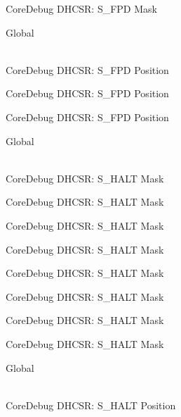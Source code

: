 \begin{DoxyRefList}
\label{deprecated__deprecated000567}%
%
Core\+Debug DHCSR\+: S\+\_\+\+FPD Mask  
\item[{\parbox[t]{\linewidth}{Global \doxylink{group___c_m_s_i_s___s_c_b_ga620b141720c475f5bde4138855c6ed83}{Core\+Debug\+\_\+\+DHCSR\+\_\+\+S\+\_\+\+FPD\+\_\+\+Pos} }}]\hfill \\
\label{deprecated__deprecated000013}%
%
Core\+Debug DHCSR\+: S\+\_\+\+FPD Position 

\label{deprecated__deprecated000464}%
%
Core\+Debug DHCSR\+: S\+\_\+\+FPD Position 

\label{deprecated__deprecated000566}%
%
Core\+Debug DHCSR\+: S\+\_\+\+FPD Position  
\item[{\parbox[t]{\linewidth}{Global \doxylink{group___c_m_s_i_s___core_debug_ga9f881ade3151a73bc5b02b73fe6473ca}{Core\+Debug\+\_\+\+DHCSR\+\_\+\+S\+\_\+\+HALT\+\_\+\+Msk} }}]\hfill \\
\label{deprecated__deprecated000026}%
%
Core\+Debug DHCSR\+: S\+\_\+\+HALT Mask 

\label{deprecated__deprecated000118}%
%
Core\+Debug DHCSR\+: S\+\_\+\+HALT Mask 

\label{deprecated__deprecated000172}%
%
Core\+Debug DHCSR\+: S\+\_\+\+HALT Mask 

\label{deprecated__deprecated000257}%
%
Core\+Debug DHCSR\+: S\+\_\+\+HALT Mask 

\label{deprecated__deprecated000314}%
%
Core\+Debug DHCSR\+: S\+\_\+\+HALT Mask 

\label{deprecated__deprecated000390}%
%
Core\+Debug DHCSR\+: S\+\_\+\+HALT Mask 

\label{deprecated__deprecated000477}%
%
Core\+Debug DHCSR\+: S\+\_\+\+HALT Mask 

\label{deprecated__deprecated000579}%
%
Core\+Debug DHCSR\+: S\+\_\+\+HALT Mask  
\item[{\parbox[t]{\linewidth}{Global \doxylink{group___c_m_s_i_s___core_debug_ga760a9a0d7f39951dc3f07d01f1f64772}{Core\+Debug\+\_\+\+DHCSR\+\_\+\+S\+\_\+\+HALT\+\_\+\+Pos} }}]\hfill \\
\label{deprecated__deprecated000025}%
%
Core\+Debug DHCSR\+: S\+\_\+\+HALT Position 


\end{DoxyRefList}
